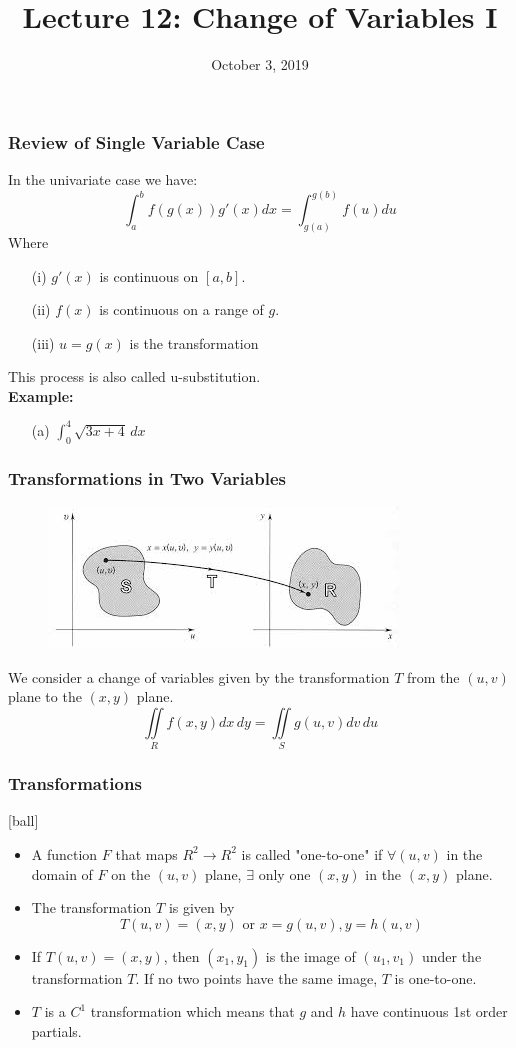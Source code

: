 \documentclass{beamer}
\title{\textbf{Lecture 12: Change of Variables I}}
\date{October 3, 2019}
\begin{document}
	
\frame{\titlepage}


\begin{frame}
\frametitle{Review of Single Variable Case}
In the univariate case we have:
$$\int_a^b f(g(x))g'(x)dx = \int_{g(a)}^{g(b)} f(u) du$$
Where
\begin{itemize}
	\item[(i)] $g'(x)$ is continuous on $[a,b]$.
	\item[(ii)] $f(x)$ is continuous on a range of $g$.
	\item[(iii)] $u=g(x)$ is the transformation
\end{itemize}
This process is also called u-substitution.\\
\vspace{12pt}
\textbf{Example:}
\begin{itemize}
	\item[(a)] $\int_0^4 \sqrt{3x+4} \, dx$
\end{itemize}
\end{frame}

\begin{frame}
\frametitle{Transformations in Two Variables}
\begin{figure}
	
	\includegraphics[width=.9\textheight]{vmap.jpg}\\
	\hspace*{10pt}\hbox{}
\end{figure}
We consider a change of variables given by the transformation $T$ from the $(u,v)$ plane to the $(x,y)$ plane.
$$\iint\limits_R f(x,y) dx\,dy = \iint\limits_S g(u,v)dv\,du$$
\end{frame}


\begin{frame}
\frametitle{Transformations}
[ball]
\begin{itemize}
	\item A function $F$ that maps $\mathit{R}^2 \rightarrow \mathit{R}^2$ is called "one-to-one" if $\forall (u,v)$ in the domain of $F$ on the $(u,v)$ plane, $\exists$ only one $(x,y)$ in the $(x,y)$ plane.
	\item The transformation $T$ is given by $$T(u,v) = (x,y) \mbox{ or } x=g(u,v), y=h(u,v)$$
	\item If $T(u,v) = (x,y)$, then $(x_1,y_1)$ is the image of $(u_1,v_1)$ under the transformation $T$. If no two points have the same image, $T$ is one-to-one.
	\item $T$ is a $C^1$ transformation which means that $g$ and $h$ have continuous 1st order partials.
\end{itemize}
\end{frame}
\end{document}
